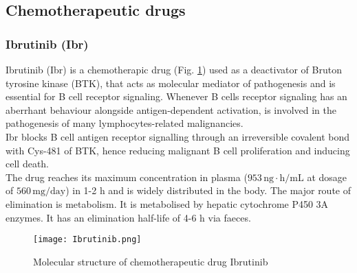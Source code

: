\subsection{Chemotherapeutic drugs}
\subsubsection{Ibrutinib (Ibr)}
Ibrutinib (Ibr) is a chemotherapic drug (Fig. \ref{fig:Ibr}) used as a deactivator of Bruton tyrosine kinase (BTK), that acts as molecular mediator of pathogenesis and is essential for B cell receptor signaling\cite{ibr-1}.  
Whenever B cells receptor signaling has an aberrhant behaviour alongside antigen-dependent activation, is involved in the pathogenesis of many lymphocytes-related malignancies.\\
Ibr blocks B cell antigen receptor signalling through an irreversible covalent bond with Cys-481 of BTK, hence reducing malignant B cell proliferation and inducing cell death.\\
The drug reaches its maximum concentration in plasma ($953\,\text{ng}\cdot\text{h}/\text{mL}$ at dosage of $560\,\text{mg}/\text{day}$) in 1-2 h and is widely distributed in the body. The major route of elimination is metabolism. It is metabolised by hepatic cytochrome P450 3A enzymes. It has an elimination half-life of 4-6 h via faeces.\\
\begin{figure}[htbp!]
	\centering
	\texttt{[image: Ibrutinib.png]}
	\caption{Molecular structure of chemotherapeutic drug Ibrutinib}
	\label{fig:Ibr}
\end{figure}

